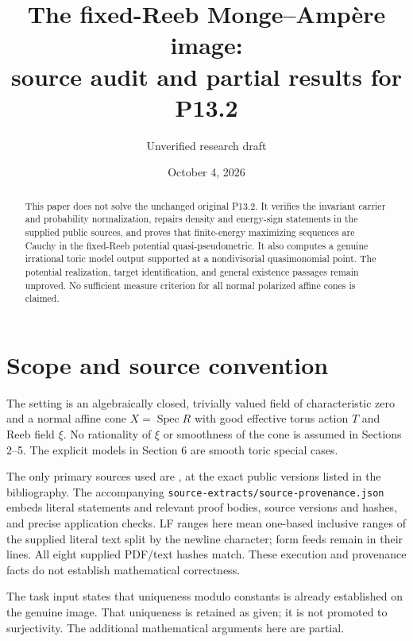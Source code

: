 \documentclass[11pt]{article}
\title{The fixed-Reeb Monge--Amp\`ere image:\\source audit and partial results for P13.2}
\author{Unverified research draft}
\date{October 4, 2026}
\newcommand{\Spec}{\operatorname{Spec}}
\theoremstyle{remark}
\begin{document}
\maketitle
\begin{abstract}
This paper does not solve the unchanged original P13.2. It verifies the invariant carrier and probability normalization, repairs density and energy-sign statements in the supplied public sources, and proves that finite-energy maximizing sequences are Cauchy in the fixed-Reeb potential quasi-pseudometric. It also computes a genuine irrational toric model output supported at a nondivisorial quasimonomial point. The potential realization, target identification, and general existence passages remain unproved. No sufficient measure criterion for all normal polarized affine cones is claimed.
\end{abstract}

\section{Scope and source convention}
The setting is an algebraically closed, trivially valued field of characteristic zero and a normal affine cone $X=\Spec R$ with good effective torus action $T$ and Reeb field $\xi$. No rationality of $\xi$ or smoothness of the cone is assumed in Sections 2--5. The explicit models in Section 6 are smooth toric special cases.

The only primary sources used are \cite{Wu21,Wu24,BJ22,BJ23}, at the exact public versions listed in the bibliography. The accompanying \texttt{source-extracts/source-provenance.json} embeds literal statements and relevant proof bodies, source versions and hashes, and precise application checks. LF ranges here mean one-based inclusive ranges of the supplied literal text split by the newline character; form feeds remain in their lines. All eight supplied PDF/text hashes match. These execution and provenance facts do not establish mathematical correctness.

The task input states that uniqueness modulo constants is already established on the genuine image. That uniqueness is retained as given; it is not promoted to surjectivity. The additional mathematical arguments here are partial.
\end{document}

